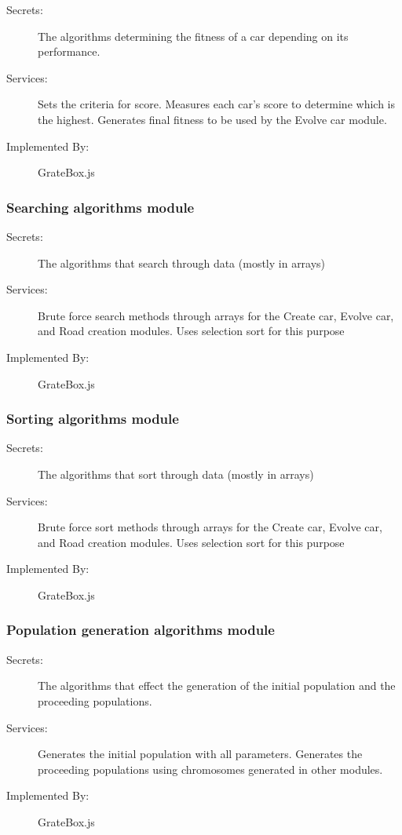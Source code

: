 \documentclass[12pt, titlepage]{article}
\begin{document}
\begin{description}
\item[Secrets:] The algorithms determining the fitness of  a car depending on 
its performance.
\item[Services:] Sets the criteria for score. Measures each car's score to 
determine which is the highest. Generates final fitness to be used by the Evolve 
car module.
\item[Implemented By:] \color{RoyalPurple}GrateBox.js
\end{description}

\subsubsection{Searching algorithms module}

\begin{description}
\item[Secrets:] The algorithms that search through data (mostly in arrays)
\item[Services:] Brute force search methods through arrays for the Create car, 
Evolve car, and Road creation modules. Uses selection sort for this purpose
\item[Implemented By:] \color{RoyalPurple}GrateBox.js
\end{description}

\subsubsection{Sorting algorithms module}

\begin{description}
\item[Secrets:] The algorithms that sort through data (mostly in arrays)
\item[Services:] Brute force sort methods through arrays for the Create car, 
Evolve car, and Road creation modules. Uses selection sort for this purpose
\item[Implemented By:] \color{RoyalPurple}GrateBox.js
\end{description}

\subsubsection{Population generation algorithms module}

\begin{description}
\item[Secrets:] The algorithms that effect the generation of the initial 
population and the proceeding populations. 
\item[Services:] Generates the initial population with all parameters. Generates 
the proceeding populations using chromosomes generated in other modules. 
\item[Implemented By:] \color{RoyalPurple}GrateBox.js
\end{description}
\end{document}
